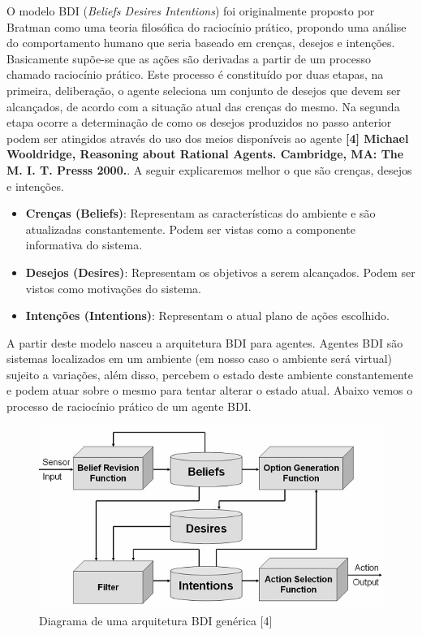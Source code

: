 O modelo BDI (\textit{Beliefs Desires Intentions}) foi originalmente proposto por Bratman como uma teoria filosófica do raciocínio prático, propondo uma análise do comportamento humano que seria baseado em crenças, desejos e intenções.
Basicamente supõe-se que as ações são derivadas a partir de um processo chamado raciocínio prático. Este processo é constituído por duas etapas, na primeira, deliberação, o agente seleciona um conjunto de desejos que devem ser alcançados, de acordo com a situação atual das crenças do mesmo. Na segunda etapa ocorre a determinação de como os desejos produzidos no passo anterior podem ser atingidos através do uso dos meios disponíveis ao agente \textbf{[4] Michael Wooldridge, Reasoning about Rational Agents. Cambridge, MA: The M. I. T. Presss 2000.}.
A seguir explicaremos melhor o que são crenças, desejos e intenções.
\begin{itemize}
\item \textbf{Crenças (Beliefs)}: Representam as características do ambiente e são atualizadas constantemente. Podem ser vistas como a componente informativa do sistema.
\item \textbf{Desejos (Desires)}: Representam os objetivos a serem alcançados. Podem ser vistos como motivações do sistema.
\item \textbf{Intenções (Intentions)}: Representam o atual plano de ações escolhido. 
\end{itemize}

A partir deste modelo nasceu a arquitetura BDI para agentes. Agentes BDI são sistemas localizados em um ambiente (em nosso caso o ambiente será virtual) sujeito a variações, além disso, percebem o estado deste ambiente constantemente e podem atuar sobre o mesmo para tentar alterar o estado atual.
Abaixo vemos o processo de raciocínio prático de um agente BDI.
 
\begin{figure}
\centering
\includegraphics{figuras/visao_BDI.jpg}
\caption{Diagrama de uma arquitetura BDI genérica [4]}
\label{arquitetura BDI}
\end{figure}

